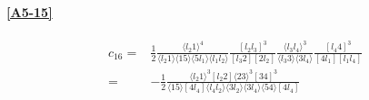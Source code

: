 \paragraph{\ref{A5-15}}
\begin{equation*}
\begin{split}
c_{16} = & \frac{1}{2}
\frac{\langle l_2 1 \rangle^4}{\langle l_2 1 \rangle\langle 15 \rangle\langle 5 l_1 \rangle\langle l_1 l_2\rangle}
\frac{[l_2 l_3]^3}{[l_3 2 ][2 l_2]}
\frac{\langle l_3 l_4\rangle^3}{\langle l_3 3\rangle\langle 3 l_4\rangle}
\frac{[l_4 4 ]^3}{[4l_1][l_1l_4]}
\\
= & 
-\frac{1}{2}\frac{\langle l_2 1\rangle^3[l_2 2 ]\langle 23 \rangle^3[34]^3}{\langle 15 \rangle[4l_4]\langle l_4 l_2\rangle\langle 3l_2\rangle \langle 3 l_4\rangle\langle 54\rangle[4l_4]}
\end{split}
\end{equation*}



















